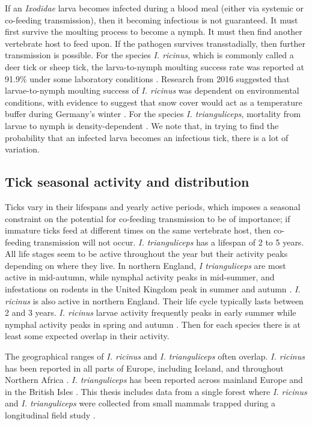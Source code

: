 \documentclass{article}
\begin{document}
If an \textit{Ixodidae} larva becomes infected during a blood meal (either via systemic or co-feeding transmission), then it becoming infectious is not guaranteed. It must first survive the moulting process to become a nymph. It must then find another vertebrate host to feed upon. If the pathogen survives transstadially, then further transmission is possible. For the species \textit{I. ricinus}, which is commonly called a deer tick or sheep tick, the larva-to-nymph moulting success rate was reported at 91.9\% under some laboratory conditions \cite{Hurry2021}. Research from 2016 suggested that larvae-to-nymph moulting success of \textit{I. ricinus} was dependent on environmental conditions, with evidence to suggest that snow cover would act as a temperature buffer during Germany's winter \cite{Dautel2016}. For the species \textit{I. trianguliceps}, mortality from larvae to nymph is density-dependent \cite{Randolph1994}. We note that, in trying to find the probability that an infected larva becomes an infectious tick, there is a lot of variation.

\subsection{Tick seasonal activity and distribution}

Ticks vary in their lifespans and yearly active periods, which imposes a seasonal constraint on the potential for co-feeding transmission to be of importance; if immature ticks feed at different times on the same vertebrate host, then co-feeding transmission will not occur. \textit{I. trianguliceps} has a lifespan of 2 to 5 years. All life stages seem to be active throughout the year but their activity peaks depending on where they live. In northern England, \textit{I trianguliceps} are most active in mid-autumn, while nymphal activity peaks in mid-summer, and infestations on rodents in the United Kingdom peak in summer and autumn \cite{Pf_ffle_2017}. \textit{I. ricinus} is also active in northern England. Their life cycle typically lasts between 2 and 3 years. \textit{I. ricinus} larvae activity frequently peaks in early summer while nymphal activity peaks in spring and autumn \cite{Otranto_2017}. Then for each species there is at least some expected overlap in their activity.

The geographical ranges of \textit{I. ricinus} and \textit{I. trianguliceps} often overlap. \textit{I. ricinus} has been reported in all parts of Europe, including Iceland, and throughout Northern Africa \cite{Otranto_2017}. \textit{I. trianguliceps} has been reported across mainland Europe and in the British Isles \cite{Pf_ffle_2017}. This thesis includes data from a single forest where \textit{I. ricinus} and \textit{I. trianguliceps} were collected from small mammals trapped during a longitudinal field study \cite{Bown2008, Bown2011}.
\end{document}
